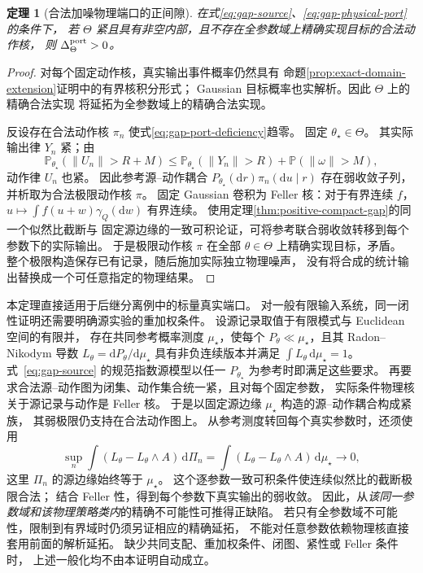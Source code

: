 \documentclass[UTF8,fontset=fandol,zihao=5,a4paper]{ctexart}
\newtheorem{theorem}{定理}[section]
\theoremstyle{definition}
\theoremstyle{remark}\newtheorem{remark}[theorem]{说明}
\numberwithin{equation}{section}
\begin{document}
\begin{theorem}[合法加噪物理端口的正间隙]
\label{thm:positive-port-gap}
在式\eqref{eq:gap-source}、\eqref{eq:gap-physical-port}的条件下，
若 $\Theta$ 紧且具有非空内部，且不存在全参数域上精确实现目标的合法动作核，
则 $\Delta_\Theta^{\rm port}>0$。
\end{theorem}

\begin{proof}
对每个固定动作核，真实输出事件概率仍然具有
命题\ref{prop:exact-domain-extension}证明中的有界核积分形式；
Gaussian 目标概率也实解析。因此 $\Theta$ 上的精确合法实现
将延拓为全参数域上的精确合法实现。

反设存在合法动作核 $\pi_n$ 使式\eqref{eq:gap-port-deficiency}趋零。
固定 $\theta_\star\in\Theta$。
其实际输出律 $Y_n$ 紧；由
\[
 \mathbb P_{\theta_\star}(\|U_n\|>R+M)
 \leq \mathbb P_{\theta_\star}(\|Y_n\|>R)
 +\mathbb P(\|\omega\|>M),
\]
动作律 $U_n$ 也紧。
因此参考源--动作耦合
$P_{\theta_\star}(\mathrm dr)\pi_n(\mathrm du\mid r)$
存在弱收敛子列，并析取为合法极限动作核 $\pi$。
固定 Gaussian 卷积为 Feller 核：对于有界连续 $f$，
$u\mapsto\int f(u+w)\gamma_Q(\mathrm dw)$ 有界连续。
使用定理\ref{thm:positive-compact-gap}的同一个似然比截断与
固定源边缘的一致可积论证，可将参考联合弱收敛转移到每个参数下的实际输出。
于是极限动作核 $\pi$ 在全部 $\theta\in\Theta$ 上精确实现目标，矛盾。
整个极限构造保存已有记录，随后施加实际独立物理噪声，
没有将合成的统计输出替换成一个可任意指定的物理结果。
\end{proof}

本定理直接适用于后继分离例中的标量真实端口。
对一般有限输入系统，同一闭性证明还需要明确源实验的重加权条件。
设源记录取值于有限模式与 Euclidean 空间的有限并，
存在共同参考概率测度 $\mu_\star$，使每个
$P_\theta\ll\mu_\star$，且其 Radon--Nikodym 导数
$L_\theta=\mathrm dP_\theta/\mathrm d\mu_\star$
具有非负连续版本并满足 $\int L_\theta\,\mathrm d\mu_\star=1$。
式~\eqref{eq:gap-source} 的规范指数源模型以任一
$P_{\theta_\star}$ 为参考时即满足这些要求。
再要求合法源--动作图为闭集、动作集合统一紧，且对每个固定参数，
实际条件物理核关于源记录与动作是 Feller 核。
于是以固定源边缘 $\mu_\star$ 构造的源--动作耦合构成紧族，
其弱极限仍支持在合法动作图上。
从参考测度转回每个真实参数时，还须使用
\[
 \sup_n\int (L_\theta-L_\theta\wedge A)\,
       \mathrm d\Pi_n
 =\int (L_\theta-L_\theta\wedge A)\,
       \mathrm d\mu_\star\longrightarrow0,
\]
这里 $\Pi_n$ 的源边缘始终等于 $\mu_\star$。
这个逐参数一致可积条件使连续似然比的截断极限合法；
结合 Feller 性，得到每个参数下真实输出的弱收敛。
因此，从\emph{该同一参数域和该物理策略类内}的精确不可能性可推得正缺陷。
若只有全参数域不可能性，限制到有界域时仍须另证相应的精确延拓，
不能对任意参数依赖物理核直接套用前面的解析延拓。
缺少共同支配、重加权条件、闭图、紧性或 Feller 条件时，
上述一般化均不由本证明自动成立。
\end{document}
